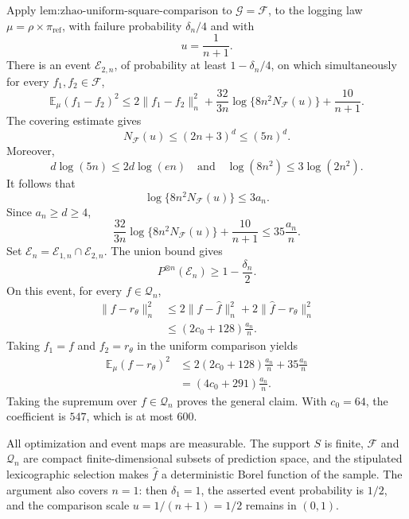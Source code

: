 Apply \(\text{lem:zhao-uniform-square-comparison}\) to \(\mathcal G=\mathcal F\), to the logging law \(\mu=\rho\times\pi_{\mathrm{ref}}\), with failure probability \(\delta_n/4\) and with
\[
u=\frac1{n+1}.
\]
There is an event \(\mathcal E_{2,n}\), of probability at least \(1-\delta_n/4\), on which simultaneously for every \(f_1,f_2\in\mathcal F\),
\[
\mathbb E_\mu(f_1-f_2)^2
\le
2\|f_1-f_2\|_n^2
+\frac{32}{3n}\log\{8n^2N_{\mathcal F}(u)\}
+\frac{10}{n+1}.
\]
The covering estimate gives
\[
N_{\mathcal F}(u)\le(2n+3)^d\le(5n)^d.
\]
Moreover,
\[
d\log(5n)\le2d\log(en)
\quad\text{and}\quad
\log(8n^2)\le3\log(2n^2).
\]
It follows that
\[
\log\{8n^2N_{\mathcal F}(u)\}\le3a_n.
\]
Since \(a_n\ge d\ge4\),
\[
\frac{32}{3n}\log\{8n^2N_{\mathcal F}(u)\}
+\frac{10}{n+1}
\le35\frac{a_n}{n}.
\]
Set \(\mathcal E_n=\mathcal E_{1,n}\cap\mathcal E_{2,n}\). The union bound gives
\[
P^{\otimes n}(\mathcal E_n)\ge1-\frac{\delta_n}{2}.
\]
On this event, for every \(f\in\mathcal Q_n\),
\[
\begin{aligned}
\|f-r_\theta\|_n^2
&\le2\|f-\widehat f\|_n^2+2\|\widehat f-r_\theta\|_n^2\\
&\le(2c_0+128)\frac{a_n}{n}.
\end{aligned}
\]
Taking \(f_1=f\) and \(f_2=r_\theta\) in the uniform comparison yields
\[
\begin{aligned}
\mathbb E_\mu(f-r_\theta)^2
&\le2(2c_0+128)\frac{a_n}{n}+35\frac{a_n}{n}\\
&=(4c_0+291)\frac{a_n}{n}.
\end{aligned}
\]
Taking the supremum over \(f\in\mathcal Q_n\) proves the general claim. With \(c_0=64\), the coefficient is \(547\), which is at most \(600\).

All optimization and event maps are measurable. The support \(S\) is finite, \(\mathcal F\) and \(\mathcal Q_n\) are compact finite-dimensional subsets of prediction space, and the stipulated lexicographic selection makes \(\widehat f\) a deterministic Borel function of the sample. The argument also covers \(n=1\): then \(\delta_1=1\), the asserted event probability is \(1/2\), and the comparison scale \(u=1/(n+1)=1/2\) remains in \((0,1)\).